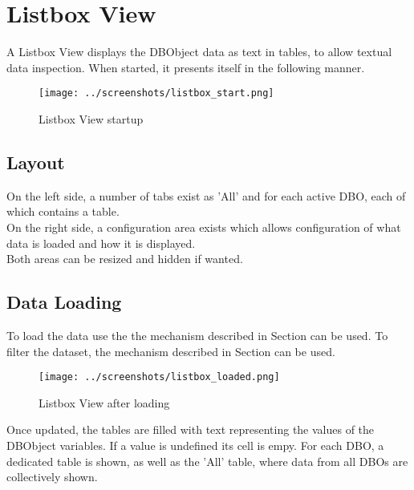 \chapter{Listbox View}
\label{sec:listbox_view}

A Listbox View displays the DBObject data as text in tables, to allow textual data inspection. When started, it presents itself in the following manner.

\begin{figure}[H]
    \hspace*{-2cm}
    \texttt{[image: ../screenshots/listbox\_start.png]}
  \caption{Listbox View startup}
  \label{fig:listbox_start}
\end{figure}

\section{Layout}


On the left side, a number of tabs exist as 'All' and for each active DBO, each of which contains a table. \\

On the right side, a configuration area exists which allows configuration of what data is loaded and how it is displayed. \\

Both areas can be resized and hidden if wanted.

\section{Data Loading}

To load the data use the the mechanism described in Section  can be used. To filter the dataset, the mechanism described in Section  can be used. \\

\begin{figure}[H]
    \hspace*{-2cm}
    \texttt{[image: ../screenshots/listbox\_loaded.png]}
  \caption{Listbox View after loading}
\end{figure}

Once updated, the tables are filled with text representing the values of the DBObject variables.  If a value is undefined its cell is empy. For each DBO, a dedicated table is shown, as well as the 'All' table, where data from all DBOs are collectively shown. \\

